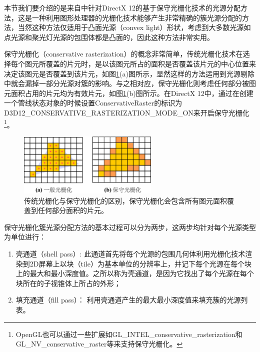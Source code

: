 本节我们要介绍的是来自\cite{a:GPUPro7:AdvancedRenderingTechniques}中针对DirectX 12的基于保守光栅化技术的光源分配方法，这是一种利用图形处理器的光栅化技术能够产生非常精确的簇光源分配的方法，当然这种方法仅适用于凸面光源（convex light）形状，考虑到大多数光源如点光源和聚光灯光源的包围体都是凸面的，因此这种方法非常实用。

保守光栅化（conservative rasterization）的概念非常简单，传统光栅化技术在选择每个图元所覆盖的片元时，是以该图元所占的面积是否覆盖该片元的中心位置来决定该图元是否覆盖到该片元，如图\ref{f:shade-conservative-rasterization}(a)图所示，显然这样的方法运用到光源剔除中就会漏掉一部分光源对簇的影响。与之相对应，保守光栅化则考虑任何部分被图元面积占用的片元均为有效片元，如图\ref{f:shade-conservative-rasterization}(b)图所示。在DirectX 12中，通过在创建一个管线状态对象的时候设置ConservativeRaster的标识为D3D12\_CONSERVATIVE\_RASTERIZATION\_MODE\_ON来开启保守光栅化\footnote{OpenGL也可以通过一些扩展如GL\_INTEL\_conservative\_rasterization和GL\_NV\_conservative\_raster等来支持保守光栅化。}。

\begin{figure}
	\sidecaption
	\includegraphics[width=0.6\textwidth]{figures/shade/conservative-rasterization}
	\caption{传统光栅化与保守光栅化的区别，保守光栅化会包含所有图元面积覆盖到任何部分面积的片元。}
	\label{f:shade-conservative-rasterization}
\end{figure}

保守光栅化簇光源分配方法的基本过程可以分为两步，这两步均针对每个光源类型为单位进行：

\begin{enumerate}
	\item 壳通道（shell pass）: 此通道首先将每个光源的包围几何体利用光栅化技术渲染到2D屏幕上以块（tile）为基本单位的分辨率上，并记下每个光源在每个块上的最大和最小深度值。之所以称为壳通道，是因为它找出了每个光源在每个块所在的子视锥体上所占的外形；
	\item 填充通道（fill pass）： 利用壳通道产生的最大最小深度值来填充簇的光源列表。
\end{enumerate}

